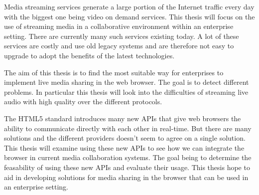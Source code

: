 
Media streaming services generate a large portion of the Internet traffic every day with the biggest one being video on demand services. This thesis will focus on the use of streaming media in a collaborative environment within an enterprise setting. There are currently many such services existing today. A lot of these services are costly and use old legacy systems and are therefore not easy to upgrade to adopt the benefits of the latest technologies.

The aim of this thesis is to find the most suitable way for enterprises to implement live media sharing in the web browser. The goal is to detect different problems. In particular this thesis will look into the difficulties of streaming live audio with high quality over the different protocols.

The HTML5 standard introduces many new APIs that give web browsers the ability to communicate directly with each other in real-time. But there are many solutions and the different providers doesn't seem to agree on a single solution. This thesis will examine using these new APIs to see how we can integrate the browser in current media collaboration systems. The goal being to determine the feasability of using these new APIs and evaluate their usage. This thesis hope to aid in developing solutions for media sharing in the browser that can be used in an enterprise setting. 
